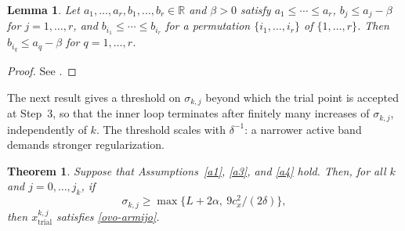 \documentclass[11pt]{article}
\newcommand{\xkjtrial}{x^{k,j}_{\mathrm{trial}}}
\newtheorem{theorem}{Theorem}[section]
\newtheorem{lemma}{Lemma}[section]
\begin{document}
\begin{lemma} \label{lem1}
Let $a_1, \ldots, a_r, b_1, \ldots, b_r \in \mathbb{R}$ and $\beta > 0$ satisfy
$a_1 \leq \cdots \leq a_r$, $b_j \leq a_j - \beta$ for $j = 1, \ldots, r$, and
$b_{i_1} \leq \cdots \leq b_{i_r}$ for a permutation $\{i_1, \ldots, i_r\}$ of
$\{1, \ldots, r\}$. Then $b_{i_q} \leq a_q - \beta$ for $q = 1, \ldots, r$.
\end{lemma}

\begin{proof}
See \cite[Lemma~2.1]{dunder1}.
\end{proof}

The next result gives a threshold on $\sigma_{k,j}$ beyond which the trial point
is accepted at Step~3, so that the inner loop terminates after finitely many
increases of $\sigma_{k,j}$, independently of $k$. The threshold scales with
$\delta^{-1}$: a narrower active band demands stronger regularization.

\begin{theorem} \label{teo:suff-descent}
Suppose that Assumptions~\ref{a1}, \ref{a3}, and \ref{a4} hold. Then, for all
$k$ and $j = 0, \ldots, j_k$, if
\begin{equation} \label{este}
\sigma_{k,j} \geq \max\{ L + 2\alpha,\ 9c_x^2/(2\delta) \},
\end{equation}
then $\xkjtrial$ satisfies \eqref{ovo-armijo}.
\end{theorem}
\end{document}

